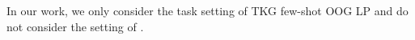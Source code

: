 \documentclass[runningheads]{llncs}
\begin{document}
In our work, we only consider the task setting of TKG few-shot OOG LP and do not consider the setting of \cite{DBLP:conf/nips/0004LSLLYA22}.
\end{document}
